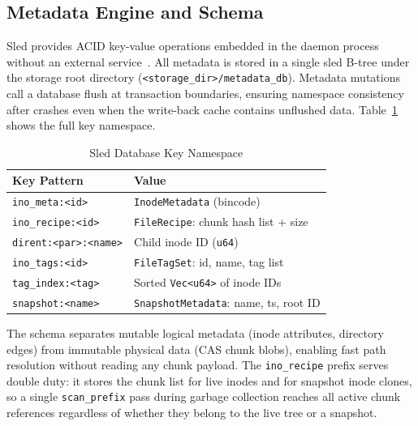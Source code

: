\documentclass[5p,times]{elsarticle}
\begin{document}
\subsection{Metadata Engine and Schema}

Sled provides ACID key-value operations embedded in the daemon process
without an external service~\cite{sled2024}.  All metadata is stored
in a single sled B-tree under the storage root directory
(\texttt{<storage\_dir>/metadata\_db}).  Metadata mutations call a database flush at transaction boundaries,
ensuring namespace consistency after crashes even when the write-back
cache contains unflushed data.  Table~\ref{tab:schema} shows the full key namespace.

\begin{table}[t]
\caption{Sled Database Key Namespace}
\label{tab:schema}
\centering
\renewcommand{\arraystretch}{1.2}
\footnotesize
\begin{tabular}{p{4.2cm}p{3.6cm}}
\toprule
\textbf{Key Pattern} & \textbf{Value} \\
\midrule
\texttt{ino\_meta:\textless{}id\textgreater{}} &
  \texttt{InodeMetadata} (bincode) \\
\texttt{ino\_recipe:\textless{}id\textgreater{}} &
  \texttt{FileRecipe}: chunk hash list + size \\
\texttt{dirent:\textless{}par\textgreater{}:\textless{}name\textgreater{}} &
  Child inode ID (\texttt{u64}) \\
\texttt{ino\_tags:\textless{}id\textgreater{}} &
  \texttt{FileTagSet}: id, name, tag list \\
\texttt{tag\_index:\textless{}tag\textgreater{}} &
  Sorted \texttt{Vec\textless{}u64\textgreater{}} of inode IDs \\
\texttt{snapshot:\textless{}name\textgreater{}} &
  \texttt{SnapshotMetadata}: name, ts, root ID \\
\bottomrule
\end{tabular}
\end{table}

The schema separates mutable logical metadata (inode attributes,
directory edges) from immutable physical data (CAS chunk blobs),
enabling fast path resolution without reading any chunk payload.
The \texttt{ino\_recipe} prefix serves double duty: it stores the
chunk list for live inodes and for snapshot inode clones, so a single
\texttt{scan\_prefix} pass during garbage collection reaches all active
chunk references regardless of whether they belong to the live tree or
a snapshot.
\end{document}
